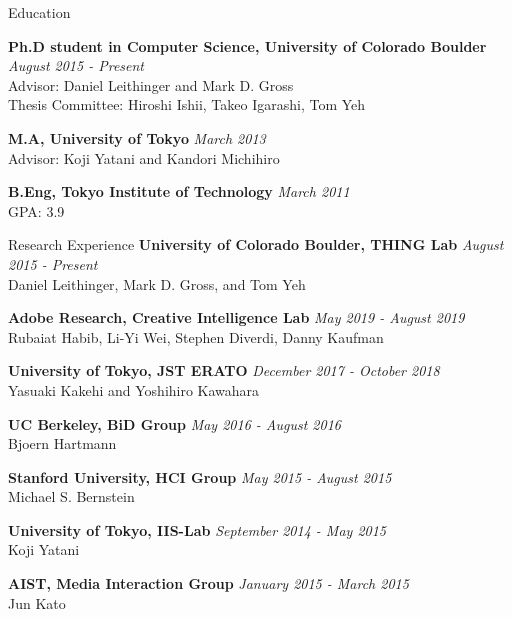 \documentclass{resume} %
\begin{document}
\begin{rSection}{Education}

{\bf Ph.D student in Computer Science, University of Colorado Boulder} \hfill {\em August 2015 - Present} \\
Advisor: Daniel Leithinger and Mark D. Gross \\
Thesis Committee: Hiroshi Ishii, Takeo Igarashi, Tom Yeh

{\bf M.A, University of Tokyo} \hfill {\em March 2013} \\
Advisor: Koji Yatani and Kandori Michihiro 

{\bf B.Eng, Tokyo Institute of Technology} \hfill {\em March 2011} \\
GPA: 3.9

\end{rSection}



\begin{rSection}{Research Experience}
{\bf University of Colorado Boulder, THING Lab} \hfill {\em August 2015 - Present} \\
Daniel Leithinger, Mark D. Gross, and Tom Yeh

{\bf Adobe Research, Creative Intelligence Lab} \hfill {\em May 2019 - August 2019} \\
Rubaiat Habib, Li-Yi Wei, Stephen Diverdi, Danny Kaufman

{\bf University of Tokyo, JST ERATO} \hfill {\em December 2017 - October 2018} \\
Yasuaki Kakehi and Yoshihiro Kawahara

{\bf UC Berkeley, BiD Group} \hfill {\em May 2016 - August 2016} \\
Bjoern Hartmann

{\bf Stanford University, HCI Group} \hfill {\em May 2015 - August 2015} \\
Michael S. Bernstein

{\bf University of Tokyo, IIS-Lab} \hfill {\em September 2014 - May 2015} \\
Koji Yatani

{\bf AIST, Media Interaction Group} \hfill {\em January 2015 - March 2015} \\
Jun Kato

\end{rSection}
\end{document}
